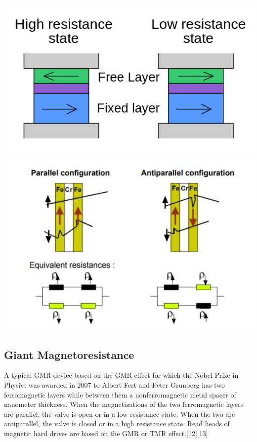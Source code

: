 \documentclass{article}
\begin{document}
\begin{center}
    \includegraphics[scale=0.41]{Spin_valve_schematic.svg.png}
    \includegraphics[scale=0.6]{Annotation 2020-10-26 154743.jpg}
\end{center}

\subsection{Giant Magnetoresistance}
A typical GMR device based on the GMR effect for which the Nobel Prize in Physics was awarded in 2007 to Albert Fert and Peter Grunberg has two ferromagnetic layers while between them a nonferromagnetic metal spacer of nanometer thickness. When the magnetizations of the two ferromagnetic layers are parallel, the valve is open or in a low resistance state. When the two are antiparallel, the valve is closed or in a high resistance state. Read heads of magnetic hard drives are based on the GMR or TMR effect.[12][13]
\end{document}
